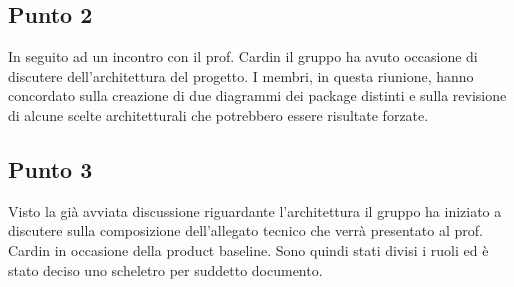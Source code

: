     \subsection{Punto 2}
        In seguito ad un incontro con il prof. Cardin il gruppo ha avuto occasione di discutere dell'architettura del progetto\glo. I membri, in questa riunione, hanno concordato sulla creazione di due diagrammi dei package distinti e sulla revisione di alcune scelte architetturali che potrebbero essere risultate forzate.
    \subsection{Punto 3}
        Visto la già avviata discussione riguardante l'architettura il gruppo ha iniziato a discutere sulla composizione dell'allegato tecnico che verrà presentato al prof. Cardin in occasione della product baseline. Sono quindi stati divisi i ruoli ed è stato deciso uno scheletro per suddetto documento.